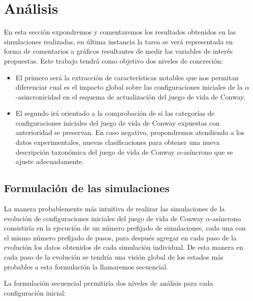 \documentclass[../proyecto.tex]{memoir}
\begin{document}
\chapter{Análisis}

En esta sección expondremos y comentaremos los resultados obtenidos en las simulaciones realizadas, en última instancia la tarea se verá representada en forma de comentarios a gráficos resultantes de medir las variables de interés propuestas. Este trabajo tendrá como objetivo dos niveles de concreción:

\begin{itemize}
\item El primero será la extracción de características notables que nos permitan diferenciar cual es el impacto global sobre las configuraciones iniciales de la $\alpha$-asincronicidad en el esquema de actualización del juego de vida de Conway. 

\item El segundo irá orientado a la comprobación de si las categorías de configuraciones iniciales del juego de vida de Conway expuestas con anterioridad se preservan. En caso negativo, propondremos atendiendo a los datos experimentales, nuevas clasificaciones para obtener una nueva descripción taxonómica del juego de vida de Conway $\alpha$-asíncrono que se ajuste adecuadamente.
\end{itemize}


\section{Formulación de las simulaciones}

La manera probablemente más intuitiva de realizar las simulaciones de la evolución de configuraciones iniciales del juego de vida de Conway $\alpha$-asíncrono consistiría en la ejecución de un número prefijado de simulaciones, cada una con el mismo número prefijado de pasos, para después agregar en cada paso de la evolución los datos obtenidos de cada simulación individual. De esta manera en cada paso de la evolución se tendría una visión global de los estados más probables a esta formulación la llamaremos secuencial. 

La formulación secuencial permitiría dos niveles de análisis para cada configuración inicial:
\end{document}
